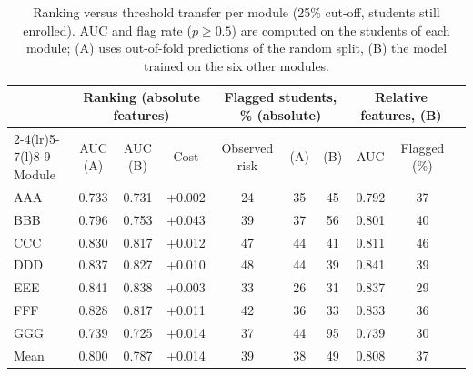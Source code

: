 \begin{table}[t]
\centering
\caption{Ranking versus threshold transfer per module (25\% cut-off, students still enrolled). AUC and flag rate ($p \geq 0.5$) are computed on the students of each module; (A) uses out-of-fold predictions of the random split, (B) the model trained on the six other modules.}
\label{tab:transfer}
\begin{tabular}{@{}lccccccccc@{}}
\toprule
 & \multicolumn{3}{c}{Ranking (absolute features)} & \multicolumn{3}{c}{Flagged students, \% (absolute)} & \multicolumn{2}{c}{Relative features, (B)} \\
\cmidrule(lr){2-4}\cmidrule(lr){5-7}\cmidrule(l){8-9}
Module & AUC (A) & AUC (B) & Cost & Observed risk & (A) & (B) & AUC & Flagged (\%) \\
\midrule
AAA & 0.733 & 0.731 & +0.002 & 24 & 35 & 45 & 0.792 & 37 \\
BBB & 0.796 & 0.753 & +0.043 & 39 & 37 & 56 & 0.801 & 40 \\
CCC & 0.830 & 0.817 & +0.012 & 47 & 44 & 41 & 0.811 & 46 \\
DDD & 0.837 & 0.827 & +0.010 & 48 & 44 & 39 & 0.841 & 39 \\
EEE & 0.841 & 0.838 & +0.003 & 33 & 26 & 31 & 0.837 & 29 \\
FFF & 0.828 & 0.817 & +0.011 & 42 & 36 & 33 & 0.833 & 36 \\
GGG & 0.739 & 0.725 & +0.014 & 37 & 44 & 95 & 0.739 & 30 \\
\midrule
Mean & 0.800 & 0.787 & +0.014 & 39 & 38 & 49 & 0.808 & 37 \\
\bottomrule
\end{tabular}
\end{table}
